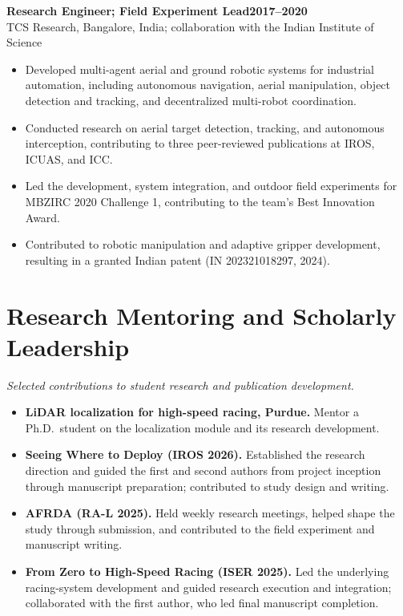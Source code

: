 \documentclass[11pt,letterpaper]{article}
\newcommand{\entry}[3]{
    \Needspace{4\baselineskip}
    \textbf{#1}\hfill\textbf{#2}\\
    #3\par
}
\begin{document}
\entry{Research Engineer; Field Experiment Lead}{2017--2020}
{TCS Research, Bangalore, India;
collaboration with the Indian Institute of Science}

\begin{itemize}
    \item Developed multi-agent aerial and ground robotic
    systems for industrial automation, including autonomous
    navigation, aerial manipulation, object detection and
    tracking, and decentralized multi-robot coordination.

    \item Conducted research on aerial target detection,
    tracking, and autonomous interception, contributing to
    three peer-reviewed publications at IROS, ICUAS, and ICC.

    \item Led the development, system integration, and outdoor
    field experiments for MBZIRC 2020 Challenge 1, contributing
    to the team's Best Innovation Award.

    \item Contributed to robotic manipulation and adaptive
    gripper development, resulting in a granted Indian patent
    (IN 202321018297, 2024).
\end{itemize}

\section{Research Mentoring and Scholarly Leadership}

\textit{Selected contributions to student research and
publication development.}

\begin{itemize}
    \item \textbf{LiDAR localization for high-speed racing,
    Purdue.}
    Mentor a Ph.D.\ student on the localization module and
    its research development.

    \item \textbf{Seeing Where to Deploy (IROS 2026).}
    Established the research direction and guided the first
    and second authors from project inception through
    manuscript preparation; contributed to study design
    and writing.

    \item \textbf{AFRDA (RA-L 2025).}
    Held weekly research meetings, helped shape the study
    through submission, and contributed to the field experiment and manuscript writing.

    \item \textbf{From Zero to High-Speed Racing (ISER 2025).}
    Led the underlying racing-system development and guided
    research execution and integration; collaborated with
    the first author, who led final manuscript completion.
\end{itemize}
\end{document}
